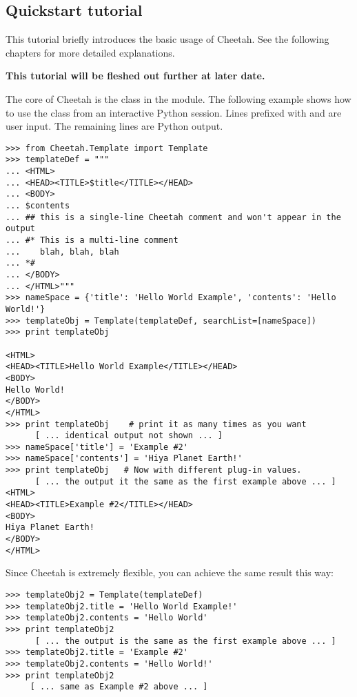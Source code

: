 \subsection{Quickstart tutorial}
\label{gettingStarted.tutorial}

This tutorial briefly introduces the basic usage of Cheetah.  See the
following chapters for more detailed explanations.  

{\bf This tutorial will be fleshed out further at later date.} 

The core of Cheetah is the  class in the 
module. The following example shows how to use the  class from an
interactive Python session. Lines prefixed with \code{>>>} and  are
user input.  The remaining lines are Python output.

\begin{verbatim}
>>> from Cheetah.Template import Template
>>> templateDef = """
... <HTML>
... <HEAD><TITLE>$title</TITLE></HEAD>
... <BODY>
... $contents
... ## this is a single-line Cheetah comment and won't appear in the output
... #* This is a multi-line comment
...    blah, blah, blah 
... *#
... </BODY>
... </HTML>"""
>>> nameSpace = {'title': 'Hello World Example', 'contents': 'Hello World!'}
>>> templateObj = Template(templateDef, searchList=[nameSpace])
>>> print templateObj
 
<HTML>
<HEAD><TITLE>Hello World Example</TITLE></HEAD>
<BODY>
Hello World!
</BODY>
</HTML>
>>> print templateObj    # print it as many times as you want
      [ ... identical output not shown ... ]
>>> nameSpace['title'] = 'Example #2'
>>> nameSpace['contents'] = 'Hiya Planet Earth!'
>>> print templateObj   # Now with different plug-in values.
      [ ... the output it the same as the first example above ... ]
<HTML>
<HEAD><TITLE>Example #2</TITLE></HEAD>
<BODY>
Hiya Planet Earth!
</BODY>
</HTML>

\end{verbatim}

Since Cheetah is extremely flexible, you can achieve the same result this
way:  

\begin{verbatim}
>>> templateObj2 = Template(templateDef)
>>> templateObj2.title = 'Hello World Example!'
>>> templateObj2.contents = 'Hello World'
>>> print templateObj2
      [ ... the output is the same as the first example above ... ]
>>> templateObj2.title = 'Example #2'
>>> templateObj2.contents = 'Hello World!'
>>> print templateObj2
     [ ... same as Example #2 above ... ]
\end{verbatim}

